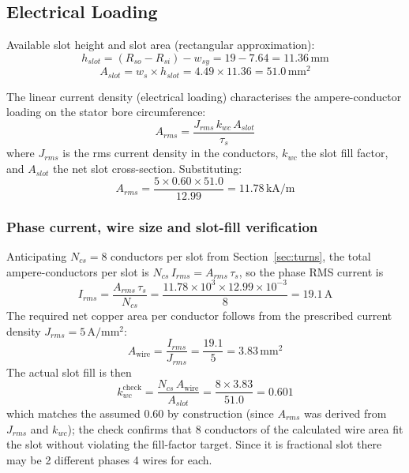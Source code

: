 \documentclass[12pt,a4paper]{article}
\newcommand{\unit}[1]{\ensuremath{\,\mathrm{#1}}}
\begin{document}
\subsection{Electrical Loading}

Available slot height and slot area (rectangular approximation):
\begin{equation}
  h_{slot} = (R_{so} - R_{si}) - w_{sy} = 19 - 7.64 = 11.36\unit{mm}
\end{equation}
\begin{equation}
  A_{slot} = w_s \times h_{slot} = 4.49 \times 11.36 = 51.0\unit{mm^2}
\end{equation}

The linear current density (electrical loading) characterises the
ampere-conductor loading on the stator bore circumference:
\begin{equation}
  A_{rms} = \frac{J_{rms}\,k_{wc}\,A_{slot}}{\tau_s}
  \label{eq:Arms}
\end{equation}
where $J_{rms}$ is the rms current density in the conductors, $k_{wc}$
the slot fill factor, and $A_{slot}$ the net slot cross-section.
Substituting:
\begin{equation}
  A_{rms} = \frac{5 \times 0.60 \times 51.0}{12.99} = \mathbf{11.78\unit{kA/m}}
\end{equation}

\subsubsection*{Phase current, wire size and slot-fill verification}

Anticipating $N_{cs} = 8$ conductors per slot from
Section~\ref{sec:turns}, the total ampere-conductors per slot is
$N_{cs}\,I_{rms} = A_{rms}\,\tau_s$, so the phase RMS current is
\begin{equation}
  I_{rms} = \frac{A_{rms}\,\tau_s}{N_{cs}}
          = \frac{11.78\times10^{3} \times 12.99\times10^{-3}}{8}
          = \mathbf{19.1\unit{A}}
\end{equation}
The required net copper area per conductor follows from the prescribed
current density $J_{rms} = 5\unit{A/mm^2}$:
\begin{equation}
  A_{\text{wire}} = \frac{I_{rms}}{J_{rms}}
                  = \frac{19.1}{5} = \mathbf{3.83\unit{mm^2}}
\end{equation}
The actual slot fill is then
\begin{equation}
  k_{wc}^{\text{check}}
   = \frac{N_{cs}\,A_{\text{wire}}}{A_{slot}}
   = \frac{8 \times 3.83}{51.0}
   = 0.601
\end{equation}
which matches the assumed 0.60 by construction (since $A_{rms}$ was
derived from $J_{rms}$ and $k_{wc}$); the check confirms that 8
conductors of the calculated wire area fit the slot without violating
the fill-factor target. Since it is fractional slot there may be 2 different phases 4 wires for each.
\end{document}
